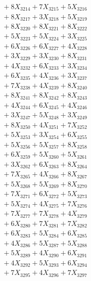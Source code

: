 \documentclass[a4paper,10pt]{article}
\begin{document}
{\begin{align}
&\;  + 8 X_{3214} + 7 X_{3215} + 5 X_{3216} \\[0.3ex]
&\;  + 8 X_{3217} + 3 X_{3218} + 5 X_{3219} \\[0.5ex]\allowbreak
&\;  + 8 X_{3220} + 8 X_{3221} + 8 X_{3222} \\[0.3ex]
&\;  + 5 X_{3223} + 5 X_{3224} + 3 X_{3225} \\[0.3ex]
&\;  + 6 X_{3226} + 6 X_{3227} + 4 X_{3228} \\[0.3ex]
&\;  + 3 X_{3229} + 3 X_{3230} + 8 X_{3231} \\[0.3ex]
&\;  + 4 X_{3232} + 6 X_{3233} + 3 X_{3234} \\[0.3ex]
&\;  + 6 X_{3235} + 4 X_{3236} + 3 X_{3237} \\[0.3ex]
&\;  + 7 X_{3238} + 4 X_{3239} + 8 X_{3240} \\[0.3ex]
&\;  + 8 X_{3241} + 8 X_{3242} + 8 X_{3243} \\[0.3ex]
&\;  + 4 X_{3244} + 6 X_{3245} + 4 X_{3246} \\[0.3ex]
&\;  + 3 X_{3247} + 5 X_{3248} + 3 X_{3249} \\[0.5ex]\allowbreak
&\;  + 8 X_{3250} + 4 X_{3251} + 7 X_{3252} \\[0.3ex]
&\;  + 5 X_{3253} + 3 X_{3254} + 6 X_{3255} \\[0.3ex]
&\;  + 5 X_{3256} + 5 X_{3257} + 8 X_{3258} \\[0.3ex]
&\;  + 6 X_{3259} + 5 X_{3260} + 5 X_{3261} \\[0.3ex]
&\;  + 3 X_{3262} + 6 X_{3263} + 8 X_{3264} \\[0.3ex]
&\;  + 7 X_{3265} + 4 X_{3266} + 8 X_{3267} \\[0.3ex]
&\;  + 5 X_{3268} + 5 X_{3269} + 8 X_{3270} \\[0.3ex]
&\;  + 7 X_{3271} + 6 X_{3272} + 5 X_{3273} \\[0.3ex]
&\;  + 5 X_{3274} + 4 X_{3275} + 7 X_{3276} \\[0.3ex]
&\;  + 7 X_{3277} + 7 X_{3278} + 4 X_{3279} \\[0.5ex]\allowbreak
&\;  + 6 X_{3280} + 7 X_{3281} + 7 X_{3282} \\[0.3ex]
&\;  + 6 X_{3283} + 5 X_{3284} + 6 X_{3285} \\[0.3ex]
&\;  + 4 X_{3286} + 5 X_{3287} + 5 X_{3288} \\[0.3ex]
&\;  + 5 X_{3289} + 4 X_{3290} + 6 X_{3291} \\[0.3ex]
&\;  + 4 X_{3292} + 5 X_{3293} + 6 X_{3294} \\[0.3ex]
&\;  + 7 X_{3295} + 4 X_{3296} + 7 X_{3297} \\[0.3ex]

\end{align}}
\end{document}
